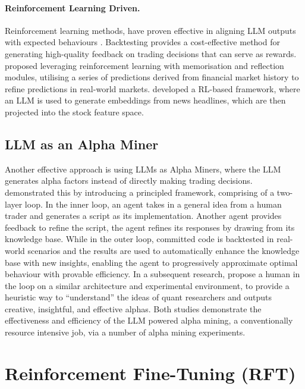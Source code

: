 \documentclass[12pt, a4paper]{report}
\begin{document}
\paragraph{Reinforcement Learning Driven.}

Reinforcement learning methods, have proven effective in aligning LLM outputs with expected behaviours \cite{ouyang2022instructgpt, lee2023rlaif}.
Backtesting provides a cost-effective method for generating high-quality feedback on trading decisions that can serve as rewards.
\cite{koa2024explainable} proposed leveraging reinforcement learning with memorisation and reflection modules, utilising a series of predictions derived from financial market history to refine predictions in real-world markets.
\cite{ding2023} developed a RL-based framework, where an LLM is used to generate embeddings from news headlines, which are then projected into the stock feature space.

\subsection{LLM as an Alpha Miner}
\label{sec:llm-alphaminer}

Another effective approach is using LLMs as Alpha Miners, where the LLM generates alpha factors instead of directly making trading decisions. 
\cite{wang2024quantagent} demonstrated this by introducing a principled framework, comprising of a two-layer loop. In the inner loop,
an agent takes in a general idea from a human trader and generates a script as its implementation.
Another agent provides feedback to refine the script, the agent refines its responses by drawing from its knowledge base.
While in the outer loop, committed code is backtested in real-world scenarios and the results are used to automatically enhance the knowledge base with new insights,
enabling the agent to progressively approximate optimal behaviour with provable efficiency. In a subsequent research,
\cite{wang2023alphagpt} propose a human in the loop on a similar architecture and experimental environment, 
to provide a heuristic way to ``understand'' the ideas of quant researchers and outputs creative, insightful, and effective alphas. 
Both studies demonstrate the effectiveness and efficiency of the LLM powered alpha mining, a conventionally resource intensive job, 
via a number of alpha mining experiments.



\section{Reinforcement Fine-Tuning (RFT)}
\label{sec:rft}
\end{document}
